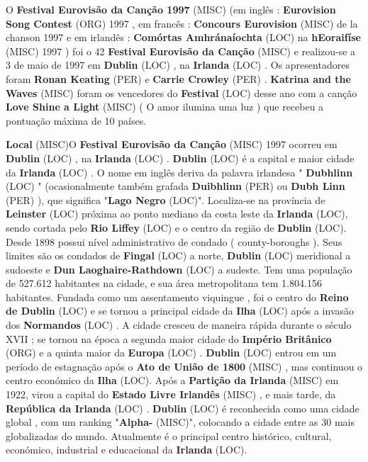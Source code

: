 \documentclass[12pt,a4paper]{article}
\begin{document}
O \textbf{Festival Eurovisão da Canção 1997} (MISC) (em inglês : \textbf{Eurovision Song Contest} (ORG) 1997 , em francês : \textbf{Concours Eurovision} (MISC) de la chanson 1997 e em irlandês : \textbf{Comórtas Amhránaíochta} (LOC) na \textbf{hEoraifíse} (MISC) 1997 ) foi o 42 \textbf{Festival Eurovisão da Canção} (MISC) e realizou-se a 3 de maio de 1997 em \textbf{Dublin} (LOC) , na \textbf{Irlanda} (LOC) . Os apresentadores foram \textbf{Ronan Keating} (PER) e \textbf{Carrie Crowley} (PER) . \textbf{Katrina and the Waves} (MISC) foram os vencedores do \textbf{Festival} (LOC) desse ano com a canção \textbf{Love Shine a Light} (MISC) ( O amor ilumina uma luz ) que recebeu a pontuação máxima de 10 países.



\textbf{Local} (MISC)O \textbf{Festival Eurovisão da Canção} (MISC) 1997 ocorreu em \textbf{Dublin} (LOC) , na \textbf{Irlanda} (LOC) . \textbf{Dublin} (LOC) é a capital e maior cidade da \textbf{Irlanda} (LOC) . O nome em inglês deriva da palavra irlandesa " \textbf{Dubhlinn} (LOC) " (ocasionalmente também grafada \textbf{Duibhlinn} (PER) ou \textbf{Dubh Linn} (PER) ), que significa "\textbf{Lago Negro} (LOC)". Localiza-se na província de \textbf{Leinster} (LOC) próxima ao ponto mediano da costa leste da \textbf{Irlanda} (LOC), sendo cortada pelo \textbf{Rio Liffey} (LOC) e o centro da região de \textbf{Dublin} (LOC). Desde 1898 possui nível administrativo de condado ( county-boroughs ). Seus limites são os condados de \textbf{Fingal} (LOC) a norte, \textbf{Dublin} (LOC) meridional a sudoeste e \textbf{Dun Laoghaire-Rathdown} (LOC) a sudeste. Tem uma população de 527.612 habitantes na cidade, e sua área metropolitana tem 1.804.156 habitantes. Fundada como um assentamento viquingue , foi o centro do \textbf{Reino de Dublin} (LOC) e se tornou a principal cidade da \textbf{Ilha} (LOC) após a invasão dos \textbf{Normandos} (LOC) . A cidade cresceu de maneira rápida durante o século XVII ; se tornou na época a segunda maior cidade do \textbf{Império Britânico} (ORG) e a quinta maior da \textbf{Europa} (LOC) . \textbf{Dublin} (LOC) entrou em um período de estagnação após o \textbf{Ato de União de 1800} (MISC) , mas continuou o centro económico da \textbf{Ilha} (LOC). Após a \textbf{Partição da Irlanda} (MISC) em 1922, virou a capital do \textbf{Estado Livre Irlandês} (MISC) , e mais tarde, da \textbf{República da Irlanda} (LOC) . \textbf{Dublin} (LOC) é reconhecida como uma cidade global , com um ranking "\textbf{Alpha-} (MISC)", colocando a cidade entre as 30 mais globalizadas do mundo. Atualmente é o principal centro histórico, cultural, económico, industrial e educacional da \textbf{Irlanda} (LOC).
\end{document}
